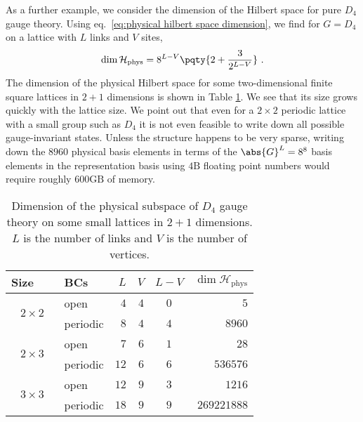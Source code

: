 As a further example, we consider the dimension of the Hilbert space for pure $D_4$ gauge theory.
Using eq.~\eqref{eq:physical hilbert space dimension}, we find for $G=D_4$ on a lattice with $L$ links and $V$ sites,
\begin{equation}
    \dim{\mathcal{H}_{\mathrm{phys}}} = 8^{L-V}\pqty{2+\frac{3}{2^{L-V}}} \ .
\end{equation}
The dimension of the physical Hilbert space for some two-dimensional finite square lattices in $2+1$ dimensions is shown in Table \ref{tab:numstates}.
We see that its size grows quickly with the lattice size.
We point out that even for a $2 \times 2$ periodic lattice with a small group such as $D_4$ it is not even feasible to write down all possible gauge-invariant states.
Unless the structure happens to be very sparse, writing down the $8960$ physical basis elements in terms of the $\abs{G}^L = 8^8$ basis elements in the representation basis using $4 \mathrm{B}$ floating point numbers would require roughly $600 \mathrm{GB}$ of memory.
\begin{table}[t]
    \centering
    \begin{tabular}{clrrcr}
        \toprule
        Size~~~ & BCs & $L$ & $V$ & $L-V$ &$\dim{\mathcal{H}_{\mathrm{phys}}}$\\
        \midrule
        \multirow{2}{3em}{$2 \times 2$}
            & open & $4$ & $4$ & $0$ & $5$\\
            & periodic & $8$ & $4$ & $4$ & $8960$ \\[5pt]
        \multirow{2}{3em}{$2 \times 3$}
            & open & $7$ & $6$ & $1$ & $28$ \\
            & periodic & $12$ & $6$ & $6$ & $536576$ \\[5pt]
        \multirow{2}{3em}{$3 \times 3$}
            & open & $12$ & $9$ & $3$ & $1216$ \\
            & periodic & $18$ & $9$ & $9$ & $269221888$ \\
        \bottomrule
    \end{tabular}
    \caption{Dimension of the physical subspace of $D_4$ gauge theory on some small lattices in $2+1$ dimensions.
$L$ is the number of links and $V$ is the number of vertices.}
    \label{tab:numstates}
\end{table}

%
